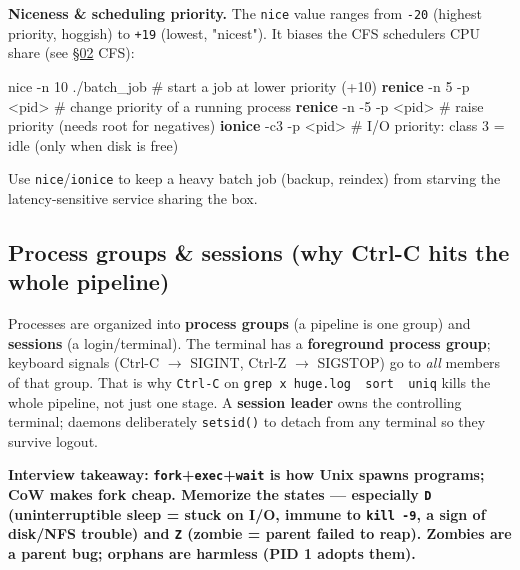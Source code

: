 \documentclass[11pt]{article}
\newenvironment{Shaded}{\begin{snugshade}}{\end{snugshade}}
\newcommand{\AttributeTok}[1]{\textcolor[rgb]{0.16,0.50,0.73}{#1}}
\newcommand{\CommentTok}[1]{\textcolor[rgb]{0.48,0.49,0.49}{#1}}
\newcommand{\ExtensionTok}[1]{\textcolor[rgb]{0.00,0.60,1.00}{\textbf{#1}}}
\newcommand{\FunctionTok}[1]{\textcolor[rgb]{0.56,0.27,0.68}{#1}}
\newcommand{\NormalTok}[1]{\textcolor[rgb]{0.81,0.81,0.76}{#1}}
\newcommand{\OperatorTok}[1]{\textcolor[rgb]{0.81,0.81,0.76}{#1}}
\begin{document}
\textbf{Niceness \& scheduling priority.} The \texttt{nice} value ranges from \texttt{-20} (highest priority, hoggish) to \texttt{+19} (lowest, "nicest"). It biases the CFS scheduler\textquotesingle s CPU share (see \hyperlink{section.02}{\textcolor{acc}{§02}} CFS):


\begin{Shaded}
\begin{Highlighting}[]
\FunctionTok{nice} \AttributeTok{{-}n}\NormalTok{ 10 ./batch\_job         }\CommentTok{\# start a job at lower priority (+10)}
\ExtensionTok{renice} \AttributeTok{{-}n}\NormalTok{ 5 }\AttributeTok{{-}p} \OperatorTok{\textless{}}\NormalTok{pid}\OperatorTok{\textgreater{}}           \CommentTok{\# change priority of a running process}
\ExtensionTok{renice} \AttributeTok{{-}n} \AttributeTok{{-}5} \AttributeTok{{-}p} \OperatorTok{\textless{}}\NormalTok{pid}\OperatorTok{\textgreater{}}          \CommentTok{\# raise priority (needs root for negatives)}
\ExtensionTok{ionice} \AttributeTok{{-}c3} \AttributeTok{{-}p} \OperatorTok{\textless{}}\NormalTok{pid}\OperatorTok{\textgreater{}}            \CommentTok{\# I/O priority: class 3 = idle (only when disk is free)}
\end{Highlighting}
\end{Shaded}

Use \texttt{nice}/\texttt{ionice} to keep a heavy batch job (backup, reindex) from starving the latency-sensitive service sharing the box.

\subsection{Process groups \& sessions (why Ctrl-C hits the whole pipeline)}\label{process-groups--sessions-why-ctrl-c-hits-the-whole-pipeline}

Processes are organized into \textbf{process groups} (a pipeline is one group) and \textbf{sessions} (a login/terminal). The terminal has a \textbf{foreground process group}; keyboard signals (Ctrl-C \(\rightarrow\) SIGINT, Ctrl-Z \(\rightarrow\) SIGSTOP) go to \emph{all} members of that group. That is why \texttt{Ctrl-C} on \texttt{grep\ x\ huge.log\ \textbar{}\ sort\ \textbar{}\ uniq} kills the whole pipeline, not just one stage. A \textbf{session leader} owns the controlling terminal; daemons deliberately \texttt{setsid()} to detach from any terminal so they survive logout.

\textbf{Interview takeaway:} \textbf{\texttt{fork}+\texttt{exec}+\texttt{wait} is how Unix spawns programs; CoW makes fork cheap. Memorize the states --- especially \texttt{D} (uninterruptible sleep = stuck on I/O, immune to \texttt{kill\ -9}, a sign of disk/NFS trouble) and \texttt{Z} (zombie = parent failed to reap). Zombies are a parent bug; orphans are harmless (PID 1 adopts them).}
\end{document}
